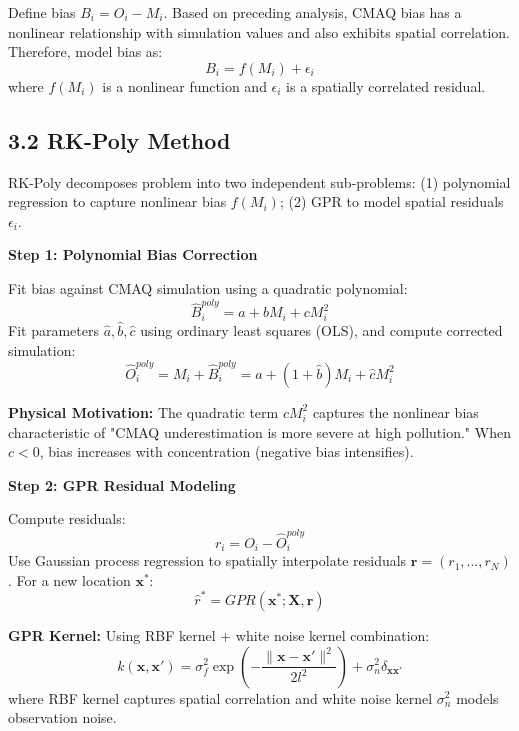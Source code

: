 \documentclass[a4paper]{article}
\begin{document}
Define bias $B_i = O_i - M_i$. Based on preceding analysis, CMAQ bias has a nonlinear relationship with simulation values and also exhibits spatial correlation. Therefore, model bias as:
\begin{equation}
    B_i = f(M_i) + \epsilon_i
    \label{eq:bias_model}
\end{equation}
where $f(M_i)$ is a nonlinear function and $\epsilon_i$ is a spatially correlated residual.

\subsection{3.2 RK-Poly Method}

RK-Poly decomposes problem  into two independent sub-problems: (1) polynomial regression to capture nonlinear bias $f(M_i)$; (2) GPR to model spatial residuals $\epsilon_i$.

\textbf{Step 1: Polynomial Bias Correction}

Fit bias against CMAQ simulation using a quadratic polynomial:
\begin{equation}
    \hat{B}^{poly}_i = a + b M_i + c M_i^2
    \label{eq:poly_fit}
\end{equation}
Fit parameters $\hat{a}, \hat{b}, \hat{c}$ using ordinary least squares (OLS), and compute corrected simulation:
\begin{equation}
    \hat{O}^{poly}_i = M_i + \hat{B}^{poly}_i = \hat{a} + (1+\hat{b})M_i + \hat{c}M_i^2
    \label{eq:poly_corrected}
\end{equation}

\textbf{Physical Motivation:} The quadratic term $c M_i^2$ captures the nonlinear bias characteristic of "CMAQ underestimation is more severe at high pollution." When $c<0$, bias increases with concentration (negative bias intensifies).

\textbf{Step 2: GPR Residual Modeling}

Compute residuals:
\begin{equation}
    r_i = O_i - \hat{O}^{poly}_i
    \label{eq:residual}
\end{equation}
Use Gaussian process regression to spatially interpolate residuals $\mathbf{r} = (r_1, ..., r_N)$. For a new location $\mathbf{x}^*$:
\begin{equation}
    \hat{r}^* = GPR(\mathbf{x}^*; \mathbf{X}, \mathbf{r})
    \label{eq:gpr}
\end{equation}

\textbf{GPR Kernel:} Using RBF kernel + white noise kernel combination:
\begin{equation}
    k(\mathbf{x}, \mathbf{x}') = \sigma_f^2 \exp\left(-\frac{\|\mathbf{x} - \mathbf{x}'\|^2}{2l^2}\right) + \sigma_n^2 \delta_{\mathbf{x}\mathbf{x}'}
    \label{eq:kernel}
\end{equation}
where RBF kernel captures spatial correlation and white noise kernel $\sigma_n^2$ models observation noise.
\end{document}
